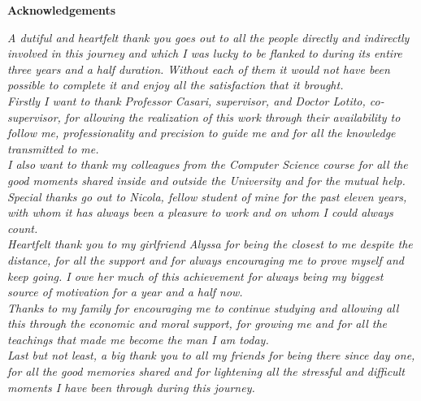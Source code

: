 \thispagestyle{empty}

\begin{center}
  {\bf \Huge Acknowledgements}
\end{center}

\vspace{4cm}


\emph{
A dutiful and heartfelt thank you goes out to all the people directly and indirectly involved in this journey and which I was lucky to be flanked to during its entire three years and a half duration. Without each of them it would not have been possible to complete it and enjoy all the satisfaction that it brought.\\
Firstly I want to thank Professor Casari, supervisor, and Doctor Lotito, co-supervisor, for allowing the realization of this work through their availability to follow me, professionality and precision to guide me and for all the knowledge transmitted to me.\\
I also want to thank my colleagues from the Computer Science course for all the good moments shared inside and outside the University and for the mutual help. Special thanks go out to Nicola, fellow student of mine for the past eleven years, with whom it has always been a pleasure to work and on whom I could always count. \\
Heartfelt thank you to my girlfriend Alyssa for being the closest to me despite the distance, for all the support and for always encouraging me to prove myself and keep going. I owe her much of this achievement for always being my biggest source of motivation for a year and a half now.\\
Thanks to my family for encouraging me to continue studying and allowing all this through the economic and moral support, for growing me and for all the teachings that made me become the man I am today.\\
Last but not least, a big thank you to all my friends for being there since day one, for all the good memories shared and for lightening all the stressful and difficult moments I have been through during this journey.}

